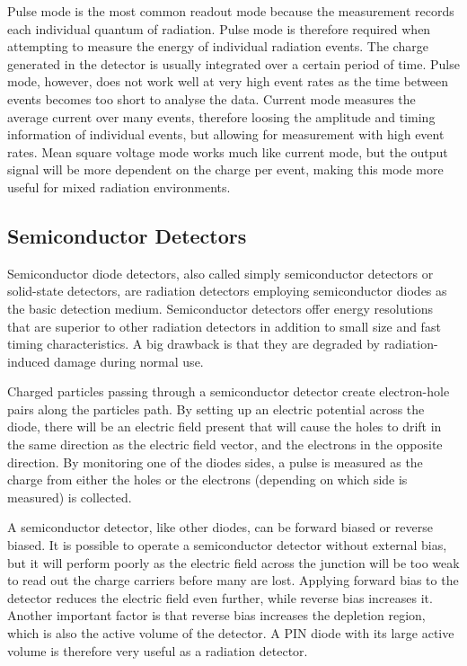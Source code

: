 \documentclass[../main/thesis.tex]{subfiles}
\begin{document}
Pulse mode is the most common readout mode because the measurement records each individual quantum of radiation. Pulse mode is therefore required when attempting to measure the energy of individual radiation events. The charge generated in the detector is usually integrated over a certain period of time. Pulse mode, however, does not work well at very high event rates as the time between events becomes too short to analyse the data. Current mode measures the average current over many events, therefore loosing the amplitude and timing information of individual events, but allowing for measurement with high event rates. Mean square voltage mode works much like current mode, but the output signal will be more dependent on the charge per event, making this mode more useful for mixed radiation environments. \citep[chap. 4]{Knoll}




\subsection{Semiconductor Detectors}
\label{t-detectors-semi}
Semiconductor diode detectors, also called simply semiconductor detectors or solid-state detectors, are radiation detectors employing semiconductor diodes as the basic detection medium. Semiconductor detectors offer energy resolutions that are superior to other radiation detectors in addition to small size and fast timing characteristics. A big drawback is that they are degraded by radiation-induced damage during normal use. \citep[chap. 11]{Knoll}

Charged particles passing through a semiconductor detector create electron-hole pairs along the particles path. By setting up an electric potential across the diode, there will be an electric field present that will cause the holes to drift in the same direction as the electric field vector, and the electrons in the opposite direction. By monitoring one of the diodes sides, a pulse is measured as the charge from either the holes or the electrons (depending on which side is measured) is collected. 

A semiconductor detector, like other diodes, can be forward biased or reverse biased. It is possible to operate a semiconductor detector without external bias, but it will perform poorly as the electric field across the junction will be too weak to read out the charge carriers before many are lost. Applying forward bias to the detector reduces the electric field even further, while reverse bias increases it. Another important factor is that reverse bias increases the depletion region, which is also the active volume of the detector. A PIN diode with its large active volume is therefore very useful as a radiation detector. \citep[chap. 11]{Knoll}
\end{document}
